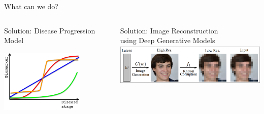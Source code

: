 \documentclass[8pt,xcolor=table]{beamer}
\begin{document}
\begin{frame}{What can we do?}
\begin{columns}[t]
\begin{column}{0.5\textwidth}
\begin{itemize}
\begin{itemize}
\end{itemize}
\end{itemize}

\vspace{2em}




\end{column}
\end{columns}


\begin{columns}[t]
\begin{column}{0.5\textwidth}
\centering

Solution: Disease Progression Model\\
\vo

\includegraphics[height=3cm]{dpm_small}

\end{column}
\begin{column}{0.5\textwidth}
\centering

Solution: Image Reconstruction\\ using Deep Generative Models\\
\vo
\includegraphics[height=2cm, trim=6 6 6 6,clip]{brgm_diagram_small}

\end{column}
\end{columns}

\end{frame}
\end{document}
